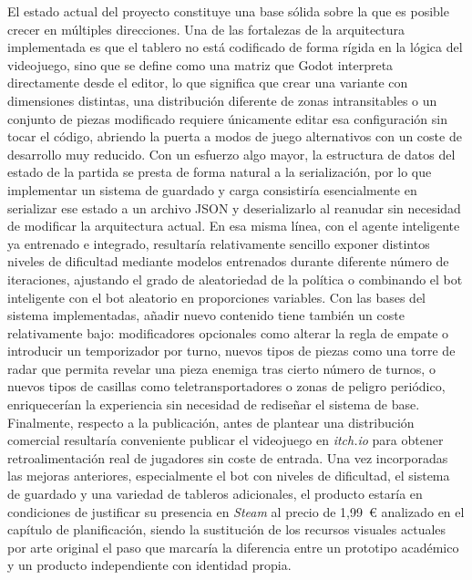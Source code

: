 El estado actual del proyecto constituye una base sólida sobre la que es posible crecer
en múltiples direcciones. Una de las fortalezas de la arquitectura implementada es que
el tablero no está codificado de forma rígida en la lógica del videojuego, sino que se
define como una matriz que Godot interpreta directamente desde el editor, lo que
significa que crear una variante con dimensiones distintas, una distribución diferente
de zonas intransitables o un conjunto de piezas modificado requiere únicamente editar
esa configuración sin tocar el código, abriendo la puerta a modos de juego alternativos
con un coste de desarrollo muy reducido. Con un esfuerzo algo mayor, la estructura de
datos del estado de la partida se presta de forma natural a la serialización, por lo
que implementar un sistema de guardado y carga consistiría esencialmente en serializar
ese estado a un archivo JSON y deserializarlo al reanudar sin necesidad de modificar la
arquitectura actual. En esa misma línea, con el agente inteligente ya entrenado e
integrado, resultaría relativamente sencillo exponer distintos niveles de dificultad
mediante modelos entrenados durante diferente número de iteraciones, ajustando el grado
de aleatoriedad de la política o combinando el bot inteligente con el bot aleatorio en
proporciones variables. Con las bases del sistema implementadas, añadir nuevo contenido
tiene también un coste relativamente bajo: modificadores opcionales como alterar la
regla de empate o introducir un temporizador por turno, nuevos tipos de piezas como una
torre de radar que permita revelar una pieza enemiga tras cierto número de turnos, o
nuevos tipos de casillas como teletransportadores o zonas de peligro periódico,
enriquecerían la experiencia sin necesidad de rediseñar el sistema de base. Finalmente,
respecto a la publicación, antes de plantear una distribución comercial resultaría
conveniente publicar el videojuego en \textit{itch.io} para obtener retroalimentación
real de jugadores sin coste de entrada. Una vez incorporadas las mejoras anteriores,
especialmente el bot con niveles de dificultad, el sistema de guardado y una variedad
de tableros adicionales, el producto estaría en condiciones de justificar su presencia
en \textit{Steam} al precio de 1,99~€ analizado en el capítulo de planificación, siendo
la sustitución de los recursos visuales actuales por arte original el paso que
marcaría la diferencia entre un prototipo académico y un producto independiente con
identidad propia.